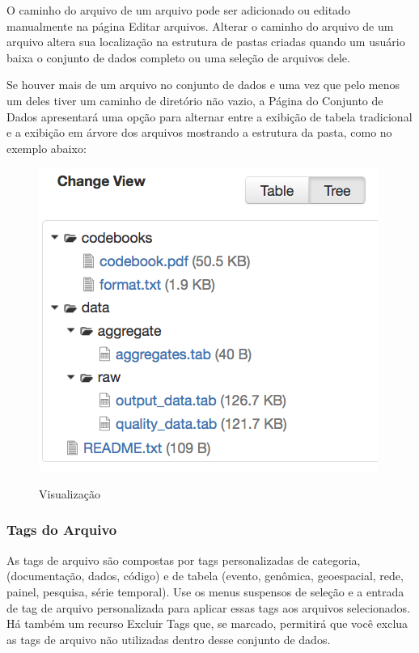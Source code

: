 \documentclass[12pt,hidelinks]{article}
\begin{document}
O caminho do arquivo de um arquivo pode ser adicionado ou editado manualmente na página Editar arquivos. Alterar o caminho do arquivo de um arquivo altera sua localização na estrutura de pastas criadas quando um usuário baixa o conjunto de dados completo ou uma seleção de arquivos dele.

Se houver mais de um arquivo no conjunto de dados e uma vez que pelo menos um deles tiver um caminho de diretório não vazio, a Página do Conjunto de Dados apresentará uma opção para alternar entre a exibição de tabela tradicional e a exibição em árvore dos arquivos mostrando a estrutura da pasta, como no exemplo abaixo:

\begin{figure}[H]
             \caption{Visualização}
                \centering
         \includegraphics[scale=0.5]{cam.png}
            \label{Caminho}
        \end{figure}
  
        \subsubsection{Tags do Arquivo}
        
\qquad As tags de arquivo são compostas por tags personalizadas de categoria, (documentação, dados, código) e de tabela (evento, genômica, geoespacial, rede, painel, pesquisa, série temporal). Use os menus suspensos de seleção e a entrada de tag de arquivo personalizada para aplicar essas tags aos arquivos selecionados. Há também um recurso Excluir Tags que, se marcado, permitirá que você exclua as tags de arquivo não utilizadas dentro desse conjunto de dados.
        
\end{document}
